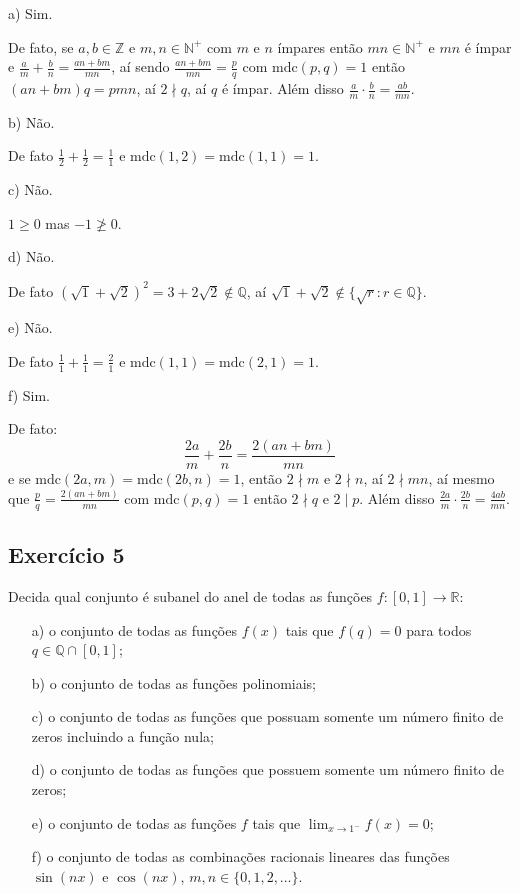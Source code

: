 \documentclass[10pt,a4paper]{article}
\begin{document}
a) Sim.

\medskip
\noindent
De fato, se $a,b\in\mathbb{Z}$ e $m,n\in\mathbb{N}^+$ com $m$ e $n$ ímpares então $mn\in\mathbb{N}^+$ e $mn$ é ímpar e $\frac{a}{m}+\frac{b}{n}=\frac{an+bm}{mn}$, aí sendo $\frac{an+bm}{mn}=\frac{p}{q}$ com $\mathrm{mdc}(p,q)=1$ então $(an+bm)q=pmn$, aí $2\nmid q$, aí $q$ é ímpar. Além disso $\frac{a}{m}\cdot\frac{b}{n}=\frac{ab}{mn}$.

\medskip
\noindent
b) Não.

\medskip
\noindent
De fato $\frac{1}{2}+\frac{1}{2}=\frac{1}{1}$ e $\mathrm{mdc}(1,2)=\mathrm{mdc}(1,1)=1$.

\medskip
\noindent
c) Não.

\medskip
\noindent
$1\geq 0$ mas $-1\ngeq 0$.

\medskip
\noindent
d) Não.

\medskip
\noindent
De fato $(\sqrt{1}+\sqrt{2})^2=3+2\sqrt{2}\notin\mathbb{Q}$, aí $\sqrt{1}+\sqrt{2}\notin\{\sqrt{r}:r\in\mathbb{Q}\}$.

\medskip
\noindent
e) Não.

\medskip
\noindent
De fato $\frac{1}{1}+\frac{1}{1}=\frac{2}{1}$ e $\mathrm{mdc}(1,1)=\mathrm{mdc}(2,1)=1$.

\medskip
\noindent
f) Sim.

\medskip
\noindent
De fato:
\[
\frac{2a}{m}+\frac{2b}{n}=\frac{2(an+bm)}{mn}
\]
e se $\mathrm{mdc}(2a,m)=\mathrm{mdc}(2b,n)=1$, então $2\nmid m$ e $2\nmid n$, aí $2\nmid mn$, aí mesmo que $\frac{p}{q}=\frac{2(an+bm)}{mn}$ com $\mathrm{mdc}(p,q)=1$ então $2\nmid q$ e $2\mid p$. Além disso $\frac{2a}{m}\cdot\frac{2b}{n}=\frac{4ab}{mn}$.

\subsection*{Exercício 5}

Decida qual conjunto é subanel do anel de todas as funções $f:[0,1]\rightarrow\mathbb{R}$:

\begin{itemize}
\item[a)] o conjunto de todas as funções $f(x)$ tais que $f(q)=0$ para todos $q\in\mathbb{Q}\cap[0,1]$;
\item[b)] o conjunto de todas as funções polinomiais;
\item[c)] o conjunto de todas as funções que possuam somente um número finito de zeros incluindo a função nula;
\item[d)] o conjunto de todas as funções que possuem somente um número finito de zeros;
\item[e)] o conjunto de todas as funções $f$ tais que $\lim_{x\to 1^-}f(x)=0$;
\item[f)] o conjunto de todas as combinações racionais lineares das funções $\sin(nx)$ e $\cos(nx)$, $m,n\in\{0,1,2,\dots\}$.
\end{itemize}
\end{document}
